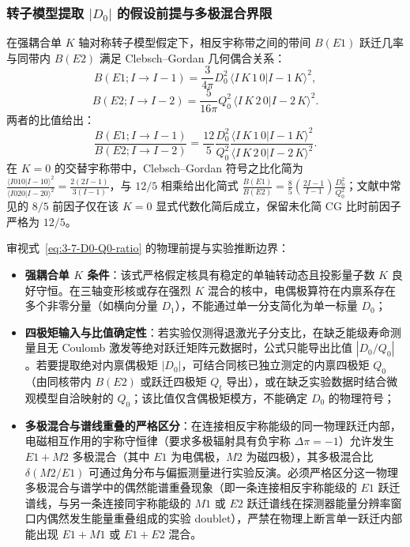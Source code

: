 \subsubsection{转子模型提取 $|D_0|$ 的假设前提与多极混合界限}

在强耦合单 $K$ 轴对称转子模型假定下，相反宇称带之间的带间 $B(E1)$ 跃迁几率与同带内 $B(E2)$ 满足 Clebsch--Gordan 几何偶合关系：
\begin{equation}\label{eq:3-7-BE1-axial-formula}
B(E1; I \to I-1) = \frac{3}{4\pi} D_0^2 \, \langle I \, K \, 1 \, 0 | I-1 \, K \rangle^2,
\end{equation}
\begin{equation}\label{eq:3-7-BE2-axial-formula}
B(E2; I \to I-2) = \frac{5}{16\pi} Q_0^2 \, \langle I \, K \, 2 \, 0 | I-2 \, K \rangle^2.
\end{equation}
两者的比值给出：
\begin{equation}\label{eq:3-7-D0-Q0-ratio}
\frac{B(E1; I \to I-1)}{B(E2; I \to I-2)} = \frac{12}{5} \frac{D_0^2}{Q_0^2} \frac{\langle I \, K \, 1 \, 0 | I-1 \, K \rangle^2}{\langle I \, K \, 2 \, 0 | I-2 \, K \rangle^2}.
\end{equation}
在 $K=0$ 的交替宇称带中，Clebsch--Gordan 符号之比化简为 $\frac{\langle I 0 1 0 | I-1 0 \rangle^2}{\langle I 0 2 0 | I-2 0 \rangle^2} = \frac{2(2I-1)}{3(I-1)}$，与 $12/5$ 相乘给出化简式 $\frac{B(E1)}{B(E2)} = \frac{8}{5} \left( \frac{2I-1}{I-1} \right) \frac{D_0^2}{Q_0^2}$；文献中常见的 $8/5$ 前因子仅在该 $K=0$ 显式代数化简后成立，保留未化简 CG 比时前因子严格为 $12/5$。

审视式~\eqref{eq:3-7-D0-Q0-ratio} 的物理前提与实验推断边界：
\begin{itemize}
\item \textbf{强耦合单 $K$ 条件}：该式严格假定核具有稳定的单轴转动态且投影量子数 $K$ 良好守恒。在三轴变形核或存在强烈 $K$ 混合的核中，电偶极算符在内禀系存在多个非零分量（如横向分量 $D_1$），不能通过单一分支简化为单一标量 $D_0$；
\item \textbf{四极矩输入与比值确定性}：若实验仅测得退激光子分支比，在缺乏能级寿命测量且无 Coulomb 激发等绝对跃迁矩阵元数据时，公式只能导出比值 $|D_0 / Q_0|$。若要提取绝对内禀偶极矩 $|D_0|$，可结合同核已独立测定的内禀四极矩 $Q_0$（由同核带内 $B(E2)$ 或跃迁四极矩 $Q_t$ 导出），或在缺乏实验数据时结合微观模型自洽映射的 $Q_0$；该比值仅含偶极矩模方，不能确定 $D_0$ 的物理符号；
\item \textbf{多极混合与谱线重叠的严格区分}：在连接相反宇称能级的同一物理跃迁内部，电磁相互作用的宇称守恒律（要求多极辐射具有负宇称 $\Delta \pi = -1$）允许发生 $E1 + M2$ 多极混合（其中 $E1$ 为电偶极，$M2$ 为磁四极），其多极混合比 $\delta(M2/E1)$ 可通过角分布与偏振测量进行实验反演。必须严格区分这一物理多极混合与谱学中的偶然能谱重叠现象（即一条连接相反宇称能级的 $E1$ 跃迁谱线，与另一条连接同宇称能级的 $M1$ 或 $E2$ 跃迁谱线在探测器能量分辨率窗口内偶然发生能量重叠组成的实验 doublet），严禁在物理上断言单一跃迁内部能出现 $E1 + M1$ 或 $E1 + E2$ 混合。
\end{itemize}

